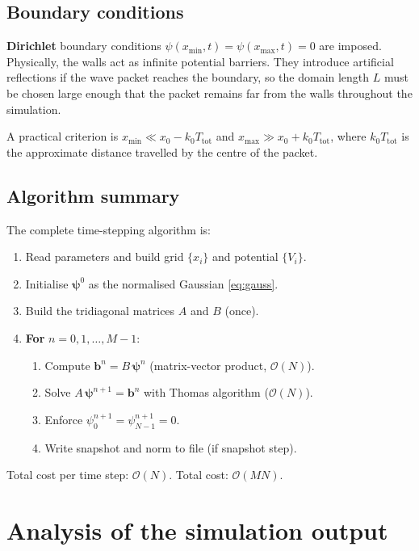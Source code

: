 \documentclass[12pt, a4paper]{article}
\begin{document}
\subsection{Boundary conditions}

\textbf{Dirichlet} boundary conditions $\psi(x_\text{min},t) =
\psi(x_\text{max},t) = 0$ are imposed.  Physically, the walls act as
infinite potential barriers.  They introduce artificial reflections if
the wave packet reaches the boundary, so the domain length $L$ must be
chosen large enough that the packet remains far from the walls throughout
the simulation.

A practical criterion is $x_\text{min} \ll x_0 - k_0 T_\text{tot}$ and
$x_\text{max} \gg x_0 + k_0 T_\text{tot}$, where $k_0 T_\text{tot}$ is
the approximate distance travelled by the centre of the packet.

\subsection{Algorithm summary}

The complete time-stepping algorithm is:

\begin{enumerate}
  \item Read parameters and build grid $\{x_i\}$ and potential $\{V_i\}$.
  \item Initialise $\boldsymbol{\psi}^0$ as the normalised Gaussian
        \eqref{eq:gauss}.
  \item Build the tridiagonal matrices $A$ and $B$ (once).
  \item \textbf{For} $n = 0, 1, \ldots, M-1$:
  \begin{enumerate}
    \item[(a)] Compute $\mathbf{b}^n = B\,\boldsymbol{\psi}^n$
               (matrix-vector product, $\mathcal{O}(N)$).
    \item[(b)] Solve $A\,\boldsymbol{\psi}^{n+1} = \mathbf{b}^n$
               with Thomas algorithm ($\mathcal{O}(N)$).
    \item[(c)] Enforce $\psi_0^{n+1} = \psi_{N-1}^{n+1} = 0$.
    \item[(d)] Write snapshot and norm to file (if snapshot step).
  \end{enumerate}
\end{enumerate}
Total cost per time step: $\mathcal{O}(N)$.  Total cost: $\mathcal{O}(MN)$.

\section{Analysis of the simulation output}
\end{document}
